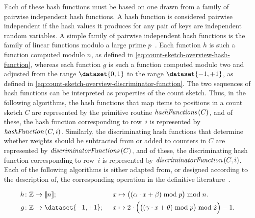 Each of these hash functions must be based on one drawn from a family of pairwise independent hash functions.
A hash function is considered pairwise independent if the hash values it produces for any pair of keys are independent random variables.
A simple family of pairwise independent hash functions is the family of linear functions modulo a large prime \( p \)~\citep{thorup00,thorup04}.
Each function \( h \) is such a function computed modulo \( n \), as defined in \cref{eq:count-sketch-overview-hash-function}, whereas each function \( g \) is such a function computed modulo two and adjusted from the range \( \dataset{0, 1} \) to the range \( \dataset{-1, +1} \), as defined in \cref{eq:count-sketch-overview-discriminator-function}.
The two sequences of hash functions can be interpreted as properties of the count sketch.
Thus, in the following algorithms, the hash functions that map items to positions in a count sketch \( C \) are represented by the primitive routine \( \hashFunctions (C) \), and of these, the hash function corresponding to row~\( i \) is represented by \( \hashFunction (C, i) \).
Similarly, the discriminating hash functions that determine whether weights should be subtracted from or added to counters in \( C \) are represented by \( \discriminatorFunctions (C) \), and of these, the discriminating hash function corresponding to row~\( i \) is represented by \( \discriminatorFunction (C, i) \).
Each of the following algorithms is either adapted from, or designed according to the description of, the corresponding operation in the definitive literature~\citep{charikar02,cormode20}.

\begin{alignat}{2}
  \label{eq:count-sketch-overview-hash-function}
  h &\colon \integers \to \dataintegerinterval{n}; & \enspace x &\mapsto \bigl( (\alpha \cdot x + \beta) \bmod p \bigr) \bmod n. \\
  \label{eq:count-sketch-overview-discriminator-function}
  g &\colon \integers \to \dataset{-1, +1}; & \enspace x &\mapsto 2 \cdot \Bigl( \bigl( (\gamma \cdot x + \theta) \bmod p \bigr) \bmod 2 \Bigr) - 1.
\end{alignat}
